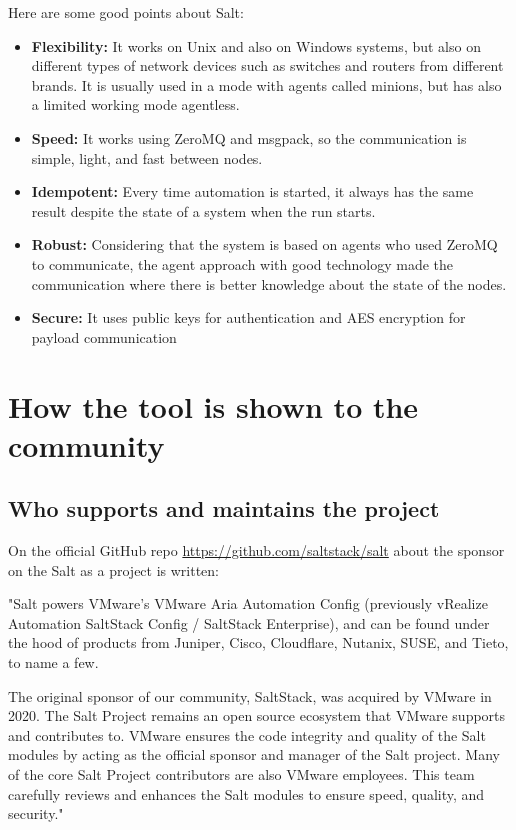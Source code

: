 \documentclass[12pt,a4paper,openright,twoside]{book}
\begin{document}
Here are some good points about Salt:
\begin{itemize}
    \item \textbf{Flexibility:} It works on Unix and also on Windows systems, but also on different types of network devices such as switches and routers from different brands.
                                It is usually used in a mode with agents called minions, but has also a limited working mode agentless.
    \item \textbf{Speed:} It works using ZeroMQ and msgpack, so the communication is simple, light, and fast between nodes.
    \item \textbf{Idempotent:} Every time automation is started, it always has the same result despite the state of a system when the run starts.
    \item \textbf{Robust:} Considering that the system is based on agents who used ZeroMQ to communicate, the agent approach with good technology made the communication where there is better knowledge about the state of the nodes.
    \item \textbf{Secure:} It uses public keys for authentication and AES encryption for payload communication
\end{itemize}

\section{How the tool is shown to the community}

\subsection{Who supports and maintains the project}
On the official GitHub repo \url{https://github.com/saltstack/salt} about the sponsor on the Salt as a project is written:


"Salt powers VMware's VMware Aria Automation Config (previously vRealize Automation SaltStack Config / SaltStack Enterprise), and can be found under the hood of products from Juniper, Cisco, Cloudflare, Nutanix, SUSE, and Tieto, to name a few.


The original sponsor of our community, SaltStack, was acquired by VMware in 2020. The Salt Project remains an open source ecosystem that VMware supports and contributes to. VMware ensures the code integrity and quality of the Salt modules by acting as the official sponsor and manager of the Salt project. Many of the core Salt Project contributors are also VMware employees. This team carefully reviews and enhances the Salt modules to ensure speed, quality, and security."\cite{saltGitHub}
\end{document}
